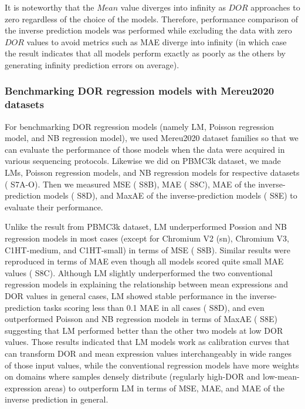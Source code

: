 \documentclass{article}
\begin{document}
It is noteworthy that the $Mean$ value diverges into infinity as $DOR$ approaches to zero regardless of the choice 
of the models. Therefore, performance comparison of the inverse prediction models was performed while excluding the data 
with zero $DOR$ values to avoid metrics such as MAE diverge into infinity (in which case the result indicates 
that all models perform exactly as poorly as the others by generating infinity prediction errors on average).

\subsubsection*{Benchmarking DOR regression models with Mereu2020 datasets}
For benchmarking DOR regression models (namely LM, Poisson regression model, and NB regression model), we 
used Mereu2020 dataset families so that we can evaluate the performance of those models when the data were 
acquired in various sequencing protocols. Likewise we did on PBMC3k dataset, we made LMs, Poisson regression 
models, and NB regression models for respective datasets (\figurename{ S7A-O}). Then we measured MSE (\figurename{ S8B}), 
MAE (\figurename{ S8C}), MAE of the inverse-prediction models (\figurename{ S8D}), and MaxAE of the inverse-prediction 
models (\figurename{ S8E}) to evaluate their performance.

Unlike the result from PBMC3k dataset, LM underperformed Possion and NB regression models in most cases 
(except for Chromium V2 (sn), Chromium V3, C1HT-medium, and C1HT-small) in terms of MSE (\figurename{ S8B}). 
Similar results were reproduced in terms of MAE even though all models scored quite small MAE values (\figurename{ S8C}).
Although LM slightly underperformed the two conventional regression models in explaining the relationship 
between mean expressions and DOR values in general cases, LM showed stable performance in the inverse-prediction 
tasks scoring less than 0.1 MAE in all cases (\figurename{ S8D}), and even outperformed Poisson and NB regression models 
in terms of MaxAE (\figurename{ S8E}) suggesting that LM performed better than the other two models at low DOR 
values. Those results indicated that LM models work as calibration curves that can transform DOR and mean 
expression values interchangeably in wide ranges of those input values, while the conventional regression models 
have more weights on domains where samples densely distribute (regularly high-DOR and low-mean-expression 
areas) to outperform LM in terms of MSE, MAE, and MAE of the inverse prediction in general.
\end{document}
